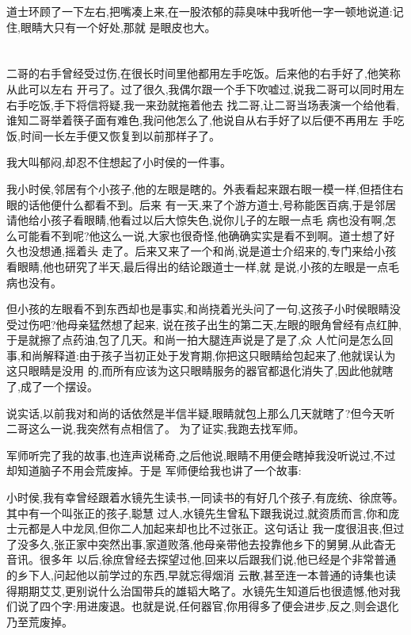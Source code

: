 ﻿\documentclass[12pt,twocolumn]{article}
\begin{document}
道士环顾了一下左右,把嘴凑上来,在一股浓郁的蒜臭味中我听他一字一顿地说道:记住,眼睛大只有一个好处,那就
是\dldots 眼皮也大。

\section{}

二哥的右手曾经受过伤,在很长时间里他都用左手吃饭。后来他的右手好了,他笑称从此可以左右
开弓了。过了很久,我偶尔跟一个手下吹嘘过,说我二哥可以同时用左右手吃饭,手下将信将疑,我一来劲就拖着他去
找二哥,让二哥当场表演一个给他看,谁知二哥举着筷子面有难色,我问他怎么了,他说自从右手好了以后便不再用左
手吃饭,时间一长左手便又恢复到以前那样子了。

我大叫郁闷,却忍不住想起了小时侯的一件事。

我小时侯,邻居有个小孩子,他的左眼是瞎的。外表看起来跟右眼一模一样,但捂住右眼的话他便什么都看不到。后来
有一天,来了个游方道士,号称能医百病,于是邻居请他给小孩子看眼睛,他看过以后大惊失色,说你儿子的左眼一点毛
病也没有啊,怎么可能看不到呢?他这么一说,大家也很奇怪,他确确实实是看不到啊。道士想了好久也没想通,摇着头
走了。后来又来了一个和尚,说是道士介绍来的,专门来给小孩看眼睛,他也研究了半天,最后得出的结论跟道士一样,就
是说,小孩的左眼是一点毛病也没有。

但小孩的左眼看不到东西却也是事实,和尚挠着光头问了一句,这孩子小时侯眼睛没受过伤吧?他母亲猛然想了起来,
说在孩子出生的第二天,左眼的眼角曾经有点红肿,于是就擦了点药油,包了几天。和尚一拍大腿连声说是了是了,众
人忙问是怎么回事,和尚解释道:由于孩子当初正处于发育期,你把这只眼睛给包起来了,他就误认为这只眼睛是没用
的,而所有应该为这只眼睛服务的器官都退化消失了,因此他就瞎了,成了一个摆设。

说实话,以前我对和尚的话依然是半信半疑,眼睛就包上那么几天就瞎了?但今天听二哥这么一说,我突然有点相信了。
为了证实,我跑去找军师。

军师听完了我的故事,也连声说稀奇,之后他说,眼睛不用便会瞎掉我没听说过,不过却知道脑子不用会荒废掉。于是
军师便给我也讲了一个故事:

小时侯,我有幸曾经跟着水镜先生读书,一同读书的有好几个孩子,有庞统、徐庶等。其中有一个叫张正的孩子,聪慧
过人,水镜先生曾私下跟我说过,就资质而言,你和庞士元都是人中龙凤,但你二人加起来却也比不过张正。这句话让
我一度很沮丧,但过了没多久,张正家中突然出事,家道败落,他母亲带他去投靠他乡下的舅舅,从此杳无音讯。很多年
以后,徐庶曾经去探望过他,回来以后跟我们说,他已经是个非常普通的乡下人,问起他以前学过的东西,早就忘得烟消
云散,甚至连一本普通的诗集也读得期期艾艾,更别说什么治国带兵的雄韬大略了。水镜先生知道后也很遗憾,他对我
们说了四个字:用进废退。也就是说,任何器官,你用得多了便会进步,反之,则会退化乃至荒废掉。
\end{document}
